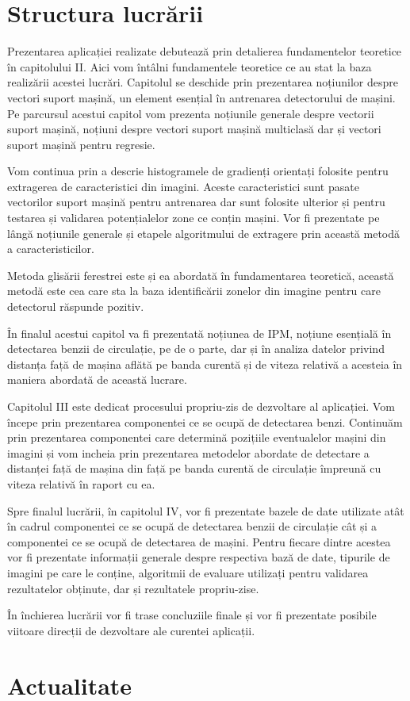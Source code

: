 \section{Structura lucrării}

Prezentarea aplicației realizate debutează prin detalierea fundamentelor teoretice în capitolului II. Aici vom întâlni fundamentele teoretice ce au stat la baza realizării acestei lucrări. Capitolul se deschide prin prezentarea noțiunilor despre vectori suport mașină, un element esențial în antrenarea detectorului de mașini. Pe parcursul acestui capitol vom prezenta noțiunile generale despre vectorii suport mașină, noțiuni despre vectori suport mașină multiclasă dar și vectori suport mașină pentru regresie. 

Vom continua prin a descrie histogramele de gradienți orientați folosite pentru extragerea de caracteristici din imagini. Aceste caracteristici sunt pasate vectorilor suport mașină pentru antrenarea dar sunt folosite ulterior și pentru testarea și validarea potențialelor zone ce conțin mașini. Vor fi prezentate pe lângă noțiunile generale și etapele algoritmului de extragere prin această metodă a caracteristicilor. 

Metoda glisării ferestrei este și ea abordată în fundamentarea teoretică, această metodă este cea care sta la baza identificării zonelor din imagine pentru care detectorul răspunde pozitiv. 

În finalul acestui capitol va fi prezentată noțiunea de IPM, noțiune esențială în detectarea benzii de circulație, pe de o parte, dar și în analiza datelor privind distanța față de mașina aflătă pe banda curentă și de viteza relativă a acesteia în maniera abordată de această lucrare.

Capitolul III este dedicat procesului propriu-zis de dezvoltare al aplicației. Vom începe prin prezentarea componentei ce se ocupă de detectarea benzi. Continuăm prin prezentarea componentei care determină pozițiile eventualelor mașini din imagini și vom incheia prin prezentarea metodelor abordate de detectare a distanței față de mașina din față pe banda curentă de circulație împreună cu viteza relativă în raport cu ea.

Spre finalul lucrării, în capitolul IV, vor fi prezentate bazele de date utilizate atât în cadrul componentei ce se ocupă de detectarea benzii de circulație cât și a componentei ce se ocupă de detectarea de mașini. Pentru fiecare dintre acestea vor fi prezentate informații generale despre respectiva bază de date, tipurile de imagini pe care le conține, algoritmii de evaluare utilizați pentru validarea rezultatelor obținute, dar și rezultatele propriu-zise.

În închierea lucrării vor fi trase concluziile finale și vor fi prezentate posibile viitoare direcții de dezvoltare ale curentei aplicații.

\section{Actualitate}


